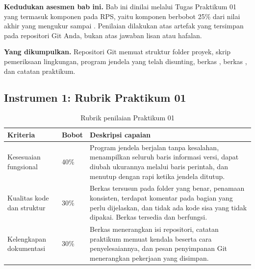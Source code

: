 \label{sec:asesmen-lingkungan}

\begin{asesmenbox}
\textbf{Kedudukan asesmen bab ini.} Bab ini dinilai melalui Tugas Praktikum 01
yang termasuk komponen  pada RPS,
yaitu komponen berbobot 25\% dari nilai akhir yang mengukur
 sampai . Penilaian dilakukan atas artefak yang tersimpan pada
repositori Git Anda, bukan atas jawaban lisan atau hafalan.

\vspace{0.4em}
\textbf{Yang dikumpulkan.} Repositori Git memuat struktur folder proyek,
skrip pemeriksaan lingkungan, program jendela yang telah disunting, berkas
, berkas , dan catatan praktikum.
\end{asesmenbox}

\subsection*{Instrumen 1: Rubrik Praktikum 01}

\begin{table}[htbp]
\centering
\caption{Rubrik penilaian Praktikum 01}
\label{tab:rubrik-praktikum-01}
{\setlength{\tabcolsep}{4pt}\footnotesize%
\begin{tabularx}{\textwidth}{@{}L{3.8cm} C{1.5cm} Y@{}}
\toprule
\headrow \textbf{Kriteria} & \textbf{Bobot} & \textbf{Deskripsi capaian} \\
\midrule
Kesesuaian fungsional & 40\% &
Program jendela berjalan tanpa kesalahan, menampilkan seluruh baris informasi
versi, dapat diubah ukurannya melalui baris perintah, dan menutup dengan rapi
ketika jendela ditutup. \\
\addlinespace
Kualitas kode dan struktur & 30\% &
Berkas tersusun pada folder yang benar, penamaan konsisten, terdapat komentar
pada bagian yang perlu dijelaskan, dan tidak ada kode sisa yang tidak dipakai.
Berkas  tersedia dan berfungsi. \\
\addlinespace
Kelengkapan dokumentasi & 30\% &
Berkas  menerangkan isi repositori, catatan praktikum memuat
kendala beserta cara penyelesaiannya, dan pesan penyimpanan Git menerangkan
pekerjaan yang disimpan. \\
\bottomrule
\end{tabularx}}
\end{table}

